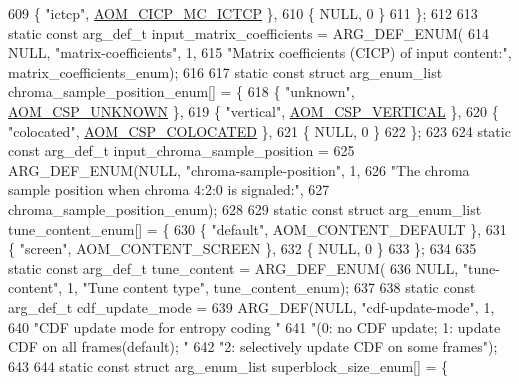 \begin{DoxyCodeInclude}
{{{{{{{609     \{ \textcolor{stringliteral}{"ictcp"}, \hyperlink{aom__image_8h_a6bc018ed9689367acae810bc58527081a7695b0577d3884a89c578f28f4237aee}{AOM\_CICP\_MC\_ICTCP} \},
610     \{ NULL, 0 \}
611 \};
612 
613 \textcolor{keyword}{static} \textcolor{keyword}{const} arg\_def\_t input\_matrix\_coefficients = ARG\_DEF\_ENUM(
614     NULL, \textcolor{stringliteral}{"matrix-coefficients"}, 1,
615     \textcolor{stringliteral}{"Matrix coefficients (CICP) of input content:"}, matrix\_coefficients\_enum);
616 
617 \textcolor{keyword}{static} \textcolor{keyword}{const} \textcolor{keyword}{struct }arg\_enum\_list chroma\_sample\_position\_enum[] = \{
618     \{ \textcolor{stringliteral}{"unknown"}, \hyperlink{aom__image_8h_a10590253ef3dbde7e93ed5d4b4e0e73ba7843506f3e28f720be0d4f03237fb48c}{AOM\_CSP\_UNKNOWN} \},
619     \{ \textcolor{stringliteral}{"vertical"}, \hyperlink{aom__image_8h_a10590253ef3dbde7e93ed5d4b4e0e73baf95ced9b8288642205301cc51e0b55c6}{AOM\_CSP\_VERTICAL} \},
620     \{ \textcolor{stringliteral}{"colocated"}, \hyperlink{aom__image_8h_a10590253ef3dbde7e93ed5d4b4e0e73ba01ef7204c2234ef43acfd493d5e18c84}{AOM\_CSP\_COLOCATED} \},
621     \{ NULL, 0 \}
622 \};
623 
624 \textcolor{keyword}{static} \textcolor{keyword}{const} arg\_def\_t input\_chroma\_sample\_position =
625     ARG\_DEF\_ENUM(NULL, \textcolor{stringliteral}{"chroma-sample-position"}, 1,
626         \textcolor{stringliteral}{"The chroma sample position when chroma 4:2:0 is signaled:"},
627         chroma\_sample\_position\_enum);
628 
629 \textcolor{keyword}{static} \textcolor{keyword}{const} \textcolor{keyword}{struct }arg\_enum\_list tune\_content\_enum[] = \{
630     \{ \textcolor{stringliteral}{"default"}, AOM\_CONTENT\_DEFAULT \},
631     \{ \textcolor{stringliteral}{"screen"}, AOM\_CONTENT\_SCREEN \},
632     \{ NULL, 0 \}
633 \};
634 
635 \textcolor{keyword}{static} \textcolor{keyword}{const} arg\_def\_t tune\_content = ARG\_DEF\_ENUM(
636     NULL, \textcolor{stringliteral}{"tune-content"}, 1, \textcolor{stringliteral}{"Tune content type"}, tune\_content\_enum);
637 
638 \textcolor{keyword}{static} \textcolor{keyword}{const} arg\_def\_t cdf\_update\_mode =
639     ARG\_DEF(NULL, \textcolor{stringliteral}{"cdf-update-mode"}, 1,
640         \textcolor{stringliteral}{"CDF update mode for entropy coding "}
641         \textcolor{stringliteral}{"(0: no CDF update; 1: update CDF on all frames(default); "}
642         \textcolor{stringliteral}{"2: selectively update CDF on some frames"});
643 
644 \textcolor{keyword}{static} \textcolor{keyword}{const} \textcolor{keyword}{struct }arg\_enum\_list superblock\_size\_enum[] = \{
}}}}}}}
\end{DoxyCodeInclude}
